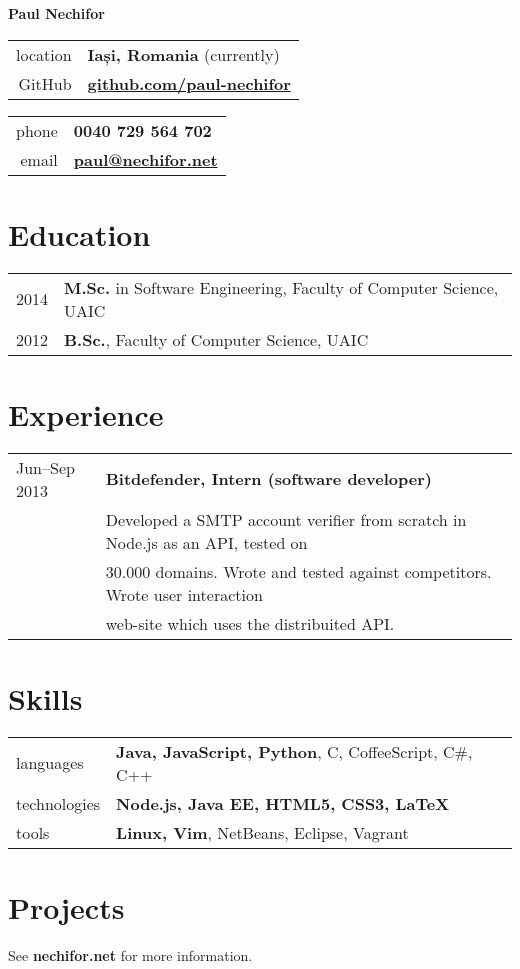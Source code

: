 \documentclass[a4wide]{article}
\newcommand{\sub}[1]{\section*{#1}}
\begin{document}
\thispagestyle{empty}

\centerline{\LARGE \bf Paul Nechifor}
\vspace{1cm}

\begin{minipage}{0.50\linewidth}
\begin{center}
\begin{tabular}{rl}
  location& {\bf Iași, Romania} (currently)\\
  GitHub& \href{http://github.com/paul-nechifor}{\bf github.com/paul-nechifor}
\end{tabular}
\end{center}
\end{minipage}
\begin{minipage}{0.50\linewidth}
\begin{center}
\begin{tabular}{rl}
  phone& {\bf 0040 729 564 702}\\
  email& \href{mailto:paul@nechifor.net}{\bf paul@nechifor.net}\\
\end{tabular}
\end{center}
\end{minipage}

\sub{Education}

\begin{tabular}{@{}ll@{}}
	2014 & {\bf M.Sc.} in Software Engineering, Faculty of Computer Science, UAIC\\
	2012 & {\bf B.Sc.}, Faculty of Computer Science, UAIC\\
\end{tabular}

\sub{Experience}

\begin{tabular}{@{}ll@{}}
	Jun--Sep 2013&	{\bf Bitdefender, Intern (software developer)}\\
	  & Developed a SMTP account verifier from scratch in Node.js as an API, tested on\\
	  & 30.000 domains. Wrote and tested against competitors. Wrote user interaction\\
    & web-site which uses the distribuited API.\\
\end{tabular}

\sub{Skills}

\begin{tabular}{@{}ll@{}}
  languages& {\bf Java, JavaScript, Python}, C, CoffeeScript, C\#, C++\\
  technologies& {\bf Node.js, Java EE, HTML5, CSS3, \LaTeX{}}\\
  tools& {\bf Linux, Vim}, NetBeans, Eclipse, Vagrant\\
\end{tabular}

\sub{Projects}

\vspace{2cm}
\centerline{See \textbf{nechifor.net} for more information.}
\end{document}
